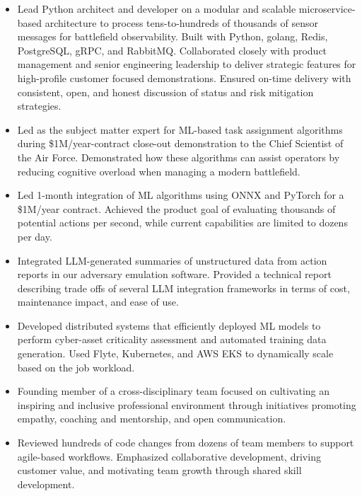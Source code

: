\begin{itemize}
\item Lead Python architect and developer on a modular and scalable microservice-based architecture to process tens-to-hundreds of thousands of sensor messages for battlefield observability. Built with Python, golang, Redis, PostgreSQL, gRPC, and RabbitMQ. Collaborated closely with product management and senior engineering leadership to deliver strategic features for high-profile customer focused demonstrations. Ensured on-time delivery with consistent, open, and honest discussion of status and risk mitigation strategies.
\item Led as the subject matter expert for ML-based task assignment algorithms during \$1M/year-contract close-out demonstration to the Chief Scientist of the Air Force. Demonstrated how these algorithms can assist operators by reducing cognitive overload when managing a modern battlefield.
\item Led 1-month integration of ML algorithms using ONNX and PyTorch for a \$1M/year contract. Achieved the product goal of evaluating thousands of potential actions per second, while current capabilities are limited to dozens per day.
\item Integrated LLM-generated summaries of unstructured data from action reports in our adversary emulation software. Provided a technical report describing trade offs of several LLM integration frameworks in terms of cost, maintenance impact, and ease of use.
\item Developed distributed systems that efficiently deployed ML models to perform cyber-asset criticality assessment and automated training data generation. Used Flyte, Kubernetes, and AWS EKS to dynamically scale based on the job workload.
\item Founding member of a cross-disciplinary team focused on cultivating an inspiring and inclusive professional environment through initiatives promoting empathy, coaching and mentorship, and open communication.
\item Reviewed hundreds of code changes from dozens of team members to support agile-based workflows. Emphasized collaborative development, driving customer value, and motivating team growth through shared skill development.
\end{itemize}
\sectionsep


